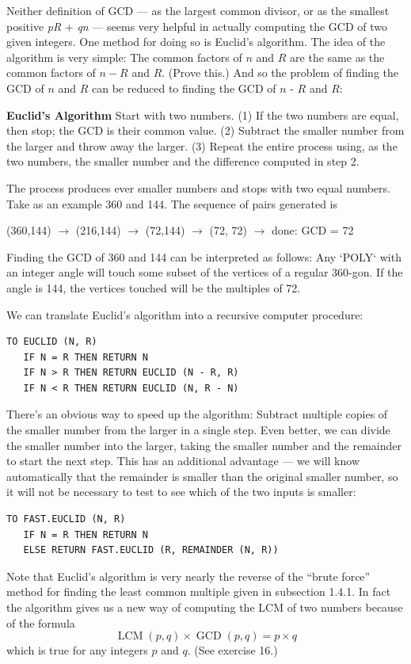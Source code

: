 \documentclass{book}
\begin{document}
Neither definition of GCD --- as the largest common divisor, or as the
smallest positive {\em pR} + {\em qn} --- seems very helpful in actually computing
the GCD of two given integers. One method for doing so is Euclid's
algorithm. The idea of the algorithm is very simple: The common factors
of $n$ and $R$ are the same as the common factors of $n - R$ and $R$. (Prove
this.) And so the problem of finding the GCD of $n$ and $R$ can be reduced
to finding the GCD of $n$ - $R$ and $R$:

\vspace{0.5cm}

\noindent \textbf{Euclid's Algorithm} Start with two numbers. (1) If the two numbers are equal, then stop; the GCD is their common value. (2) Subtract the
smaller number from the larger and throw away the larger. (3) Repeat
the entire process using, as the two numbers, the smaller number and the difference computed in step 2.

\vspace{0.5cm}

The process produces ever smaller numbers and stops with two equal
numbers. Take as an example 360 and 144. The sequence of pairs
generated is

(360,144) $\rightarrow$ (216,144) $\rightarrow$ (72,144) $\rightarrow$ (72, 72) $\rightarrow$ done: GCD = 72

Finding the GCD of 360 and 144 can be interpreted as follows: Any \textsc{`POLY`}
with an integer angle will touch some subset of the vertices of a regular
360-gon. If the angle is 144, the vertices touched will be the multiples
of 72.

We can translate Euclid's algorithm into a recursive computer procedure:

\begin{verbatim}
TO EUCLID (N, R)
   IF N = R THEN RETURN N
   IF N > R THEN RETURN EUCLID (N - R, R)
   IF N < R THEN RETURN EUCLID (N, R - N)
\end{verbatim}
There's an obvious way to speed up the algorithm: Subtract multiple
copies of the smaller number from the larger in a single step. Even better,
we can divide the smaller number into the larger, taking the smaller
number and the remainder to start the next step. This has an additional
advantage --- we will know automatically that the remainder is smaller
than the original smaller number, so it will not be necessary to test to
see which of the two inputs is smaller:

\begin{verbatim}
TO FAST.EUCLID (N, R)
   IF N = R THEN RETURN N
   ELSE RETURN FAST.EUCLID (R, REMAINDER (N, R))
\end{verbatim}
Note that Euclid's algorithm is very nearly the reverse of the ``brute
force'' method for finding the least common multiple given in subsection
1.4.1. In fact the algorithm gives us a new way of computing the LCM
of two numbers because of the formula
$$\operatorname{LCM}(p, q) \times \operatorname{GCD}(p, q) = p \times q$$
which is true for any integers $p$ and $q$. (See exercise 16.)
\end{document}

